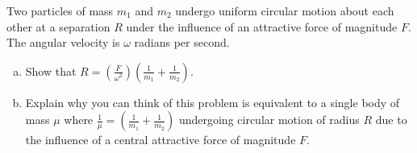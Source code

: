 \documentclass{esg8012pset}
\begin{document}
\begin{problem}[Problem 2.4]
  Two particles of mass $m_1$ and $m_2$ undergo uniform circular motion about each other at a separation $R$ under the influence of an attractive force of magnitude $F$.  The angular velocity is $\omega$ radians per second.
  \begin{enumerate}[a)]
    \item Show that $R = \left(\frac{F}{\omega^2}\right)\left(\frac{1}{m_1} + \frac{1}{m_2}\right)$.
    \item Explain why you can think of this problem is equivalent to a single body of mass $\mu$ where $\frac{1}{\mu} = \left(\frac{1}{m_1} + \frac{1}{m_2}\right)$ undergoing circular motion of radius $R$ due to the influence of a central attractive force of magnitude $F$.
  \end{enumerate}
\end{problem}
\end{document}

